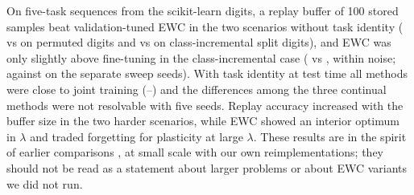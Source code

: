 On five-task sequences from the scikit-learn digits, a replay buffer of 100 stored samples beat validation-tuned EWC in the two scenarios without task identity ( vs  on permuted digits and  vs  on class-incremental split digits), and EWC was only slightly above fine-tuning in the class-incremental case ( vs , within noise;  against  on the separate sweep seeds). With task identity at test time all methods were close to joint training (--) and the differences among the three continual methods were not resolvable with five seeds. Replay accuracy increased with the buffer size in the two harder scenarios, while EWC showed an interior optimum in $\lambda$ and traded forgetting for plasticity at large $\lambda$. These results are in the spirit of earlier comparisons \cite{ven2019three,chaudhry2019tiny}, at small scale with our own reimplementations; they should not be read as a statement about larger problems or about EWC variants we did not run.
